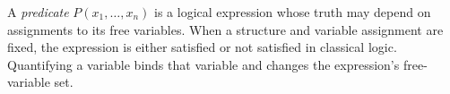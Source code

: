 
A \emph{predicate} $P(x_1,\ldots,x_n)$ is a logical expression whose truth may depend on assignments to its free variables. When a structure and variable assignment are fixed, the expression is either satisfied or not satisfied in classical logic. Quantifying a variable binds that variable and changes the expression's free-variable set.
